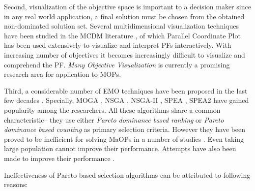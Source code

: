 \documentclass[journal]{IEEEtran}
\begin{document}
Second, visualization of the objective space is important to a decision maker since in any real world application, a final solution must be chosen from the obtained non-dominated solution set. Several multidimensional visualization techniques have been studied in the MCDM literature \cite{miettinen1999nonlinear}, of which Parallel Coordinate Plot \cite{inselberg1987parallel}\cite{146402} has been used extensively to visualize and interpret PFs interactively. With increasing number of objectives it becomes increasingly difficult to visualize and comprehend the PF. \textit{Many Objective Visualization} is currently a promising research area for application to MOPs.

Third, a considerable number of EMO techniques have been proposed in the last few decades \cite{coello1999comprehensive}. Specially, MOGA \cite{fonseca1993genetic}, NSGA \cite{srinivas1994muiltiobjective}, NSGA-II \cite{deb2002fast},  SPEA \cite{zitzler1999multiobjective}, SPEA2 \cite{zitzler2001spea2} have gained popularity among the researchers. All these algorithms share a common characteristic-- they use either \textit{Pareto dominance based ranking} or \textit{Pareto dominance based counting} as primary selection criteria. However they have been proved to be inefficient for solving MaOPs in a number of studies \cite{purshouse2003evolutionary}\cite{hughes2005evolutionary}\cite{wagner2007pareto}\cite{ishibuchi2008evolutionary}. Even taking large population cannot improve their performance. Attempts have also been made to improve their performance \cite{ishibuchi2008effectiveness}.


Ineffectiveness of Pareto based selection algorithms can be attributed to following reasons:
\end{document}
